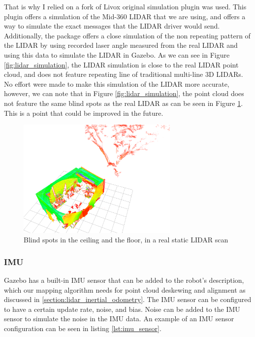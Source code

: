 \documentclass[12pt]{article}
\begin{document}
        That is why I relied on a fork \cite{livox_laser_simulation_RO2} of Livox original simulation plugin was used. This plugin offers a simulation of the Mid-360 LIDAR that we are using, and offers a way to simulate the exact messages that the LIDAR driver would send. Additionally, the package offers a close simulation of the non repeating pattern of the LIDAR by using recorded laser angle measured from the real LIDAR and using this data to simulate the LIDAR in Gazebo. As we can see in Figure \ref{fig:lidar_simulation}, the LIDAR simulation is close to the real LIDAR point cloud, and does not feature repeating line of traditional multi-line 3D LIDARs. No effort were made to make this simulation of the LIDAR more accurate, however, we can note that in Figure \ref{fig:lidar_simulation}, the point cloud does not feature the same blind spots as the real LIDAR as can be seen in Figure \ref{fig:real_lidar_scan}. This is a point that could be improved in the future.


        \begin{figure}[H]
            \centering
            \includegraphics[width=0.7\textwidth]{Images/ldiar_scan_deadzone.png}
            \caption{Blind spots in the ceiling and the floor, in a real static LIDAR scan}
            \label{fig:real_lidar_scan}
        \end{figure}

        \subsubsection{IMU}

        Gazebo has a built-in IMU sensor that can be added to the robot's description, which our mapping algorithm needs for point cloud deskewing and alignment as discussed in \ref{section:lidar_inertial_odometry}. The IMU sensor can be configured to have a certain update rate, noise, and bias. Noise can be added to the IMU sensor to simulate the noise in the IMU data. An example of an IMU sensor configuration can be seen in listing \ref{lst:imu_sensor}.
\end{document}
